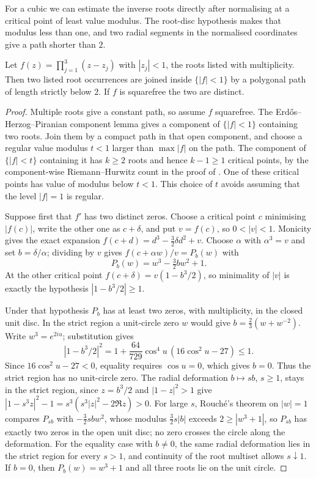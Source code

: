 \documentclass[11pt]{article}
\begin{document}
For a cubic we can estimate the inverse roots directly after normalising
at a critical point of least value modulus. The root-disc hypothesis
makes that modulus less than one, and two radial segments in the
normalised coordinates give a path shorter than $2$.


\begin{theorem}
\label{res:degree-three}
Let $f(z)=\prod_{j=1}^{3}(z-z_j)$ with $|z_j|<1$, the roots listed with
multiplicity.  Then two listed root occurrences are joined inside
$\{|f|<1\}$ by a polygonal path of length strictly below $2$.  If $f$ is
squarefree the two are distinct.
\end{theorem}

\begin{proof}
Multiple roots give a constant path, so assume $f$ squarefree.
The Erd\H{o}s--Herzog--Piranian component lemma
\cite[remark before Problem~5, p.~139]{ehp1958} gives a component of
$\{|f|<1\}$ containing two roots. Join them by a compact path in that
open component, and choose a regular value modulus $t<1$ larger than
$\max|f|$ on the path. The component of $\{|f|<t\}$ containing it has
$k\ge2$ roots and hence $k-1\ge1$ critical points, by the component-wise
Riemann--Hurwitz count in the proof of \cite[Proposition~2.1]{eks2010}.
One of these critical points has value of modulus below $t<1$. This
choice of $t$ avoids assuming that the level $|f|=1$ is regular.

Suppose first that $f'$ has two distinct zeros.  Choose a critical point $c$
minimising $|f(c)|$, write the other one as $c+\delta$, and put $v=f(c)$, so
$0<|v|<1$.  Monicity gives the exact expansion
$f(c+d)=d^3-\tfrac32\delta d^2+v$.  Choose $\alpha$ with $\alpha^3=v$ and set
$b=\delta/\alpha$; dividing by $v$ gives
$f(c+\alpha w)/v=P_b(w)$ with
\[
 P_b(w)=w^3-\tfrac32bw^2+1 .
\]
At the other critical point $f(c+\delta)=v(1-b^3/2)$, so minimality of $|v|$
is exactly the hypothesis $|1-b^3/2|\ge1$.

Under that hypothesis $P_b$ has at least two zeros, with multiplicity, in the
closed unit disc.  In the strict region a unit-circle zero $w$ would give
$b=\tfrac23(w+w^{-2})$. Write $w^3=e^{2iu}$; substitution gives
\[
 |1-b^3/2|^2
 =1+\frac{64}{729}\cos^4u\,(16\cos^2u-27)\le1.
\]
Since $16\cos^2u-27<0$, equality requires $\cos u=0$, which gives
$b=0$. Thus the strict region has no unit-circle zero.  The radial deformation $b\mapsto sb$, $s\ge1$, stays in
the strict region, since $z=b^3/2$ and $|1-z|^2>1$ give
$|1-s^3z|^2-1=s^3(s^3|z|^2-2\Re z)>0$.  For large $s$, Rouch\'e's theorem on
$|w|=1$ compares $P_{sb}$ with $-\tfrac32sbw^2$, whose modulus
$\tfrac32s|b|$ exceeds $2\ge|w^3+1|$, so $P_{sb}$ has exactly two zeros in
the open unit disc; no zero crosses the circle along the deformation.  For the equality case with $b\ne0$, the same radial deformation lies in
the strict region for every $s>1$, and continuity of the root multiset
allows $s\downarrow1$. If $b=0$, then $P_b(w)=w^3+1$ and all three
roots lie on the unit circle.


\end{proof}
\end{document}
